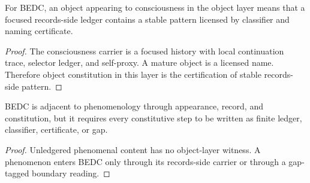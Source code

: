 \begin{theorem}
\label{thm:philosophy-object-constitution-licensed-pattern}
For BEDC, an object appearing to consciousness in the object layer
means that a focused records-side ledger contains a stable pattern
licensed by classifier and naming certificate.
\end{theorem}
\begin{proof}
The consciousness carrier is a focused history with local continuation
trace, selector ledger, and self-proxy. A mature object is a licensed
name. Therefore object constitution in this layer is the certification
of stable records-side pattern.
\end{proof}

\begin{corollary}
\label{cor:philosophy-bedc-records-side-phenomenology}
BEDC is adjacent to phenomenology through appearance, record, and
constitution, but it requires every constitutive step to be written as
finite ledger, classifier, certificate, or gap.
\end{corollary}
\begin{proof}
Unledgered phenomenal content has no object-layer witness. A phenomenon
enters BEDC only through its records-side carrier or through a
gap-tagged boundary reading.
\end{proof}

